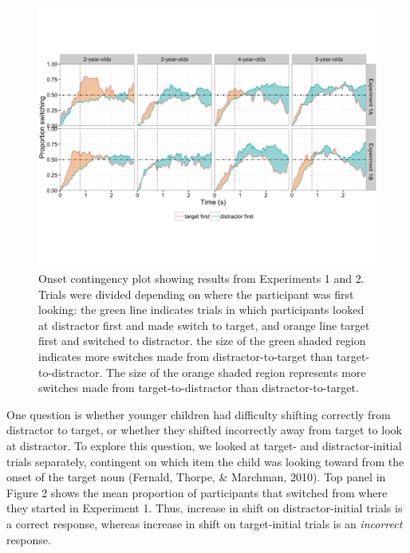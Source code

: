 \documentclass[a4paper,man,apacite,floatsintext]{apa6}
\newenvironment{CodeChunk}{}{}
\begin{document}
\begin{CodeChunk}
\begin{figure}[H]

{\centering \includegraphics{figs/et_ons-1} 

}

\caption[Onset contingency plot showing results from Experiments 1 and 2]{Onset contingency plot showing results from Experiments 1 and 2. Trials were divided depending on where the participant was first looking: the green line indicates trials in which participants looked at distractor first and made switch to target, and orange line target first and switched to distractor. the size of the green shaded region indicates more switches made from distractor-to-target than target-to-distractor. The size of the orange shaded region represents more switches made from target-to-distractor than distractor-to-target.}\label{fig:et_ons}
\end{figure}
\end{CodeChunk}

One question is whether younger children had difficulty shifting
correctly from distractor to target, or whether they shifted incorrectly
away from target to look at distractor. To explore this question, we
looked at target- and distractor-initial trials separately, contingent
on which item the child was looking toward from the onset of the target
noun (Fernald, Thorpe, \& Marchman, 2010). Top panel in Figure 2 shows
the mean proportion of participants that switched from where they
started in Experiment 1. Thus, increase in shift on distractor-initial
trials is a correct response, whereas increase in shift on
target-initial trials is an \emph{incorrect} response.
\end{document}
